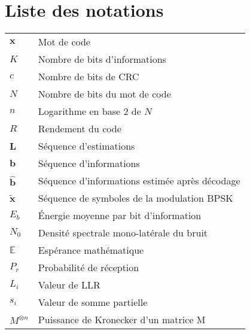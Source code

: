 \chapter*{Liste des notations}
\begin{center}

\begin{longtable}{ p{}  p{} } 

$\mathbold{x}$          & Mot de code                                             \\
$K$                     & Nombre de bits d'informations                           \\
$c$                     & Nombre de bits de CRC                                   \\
$N$                     & Nombre de bits du mot de code                           \\
$n$                     & Logarithme en base 2 de $N$                             \\
$R$                     & Rendement du code                                       \\
$\mathbold{L}$          & Séquence d'estimations                                  \\
$\mathbold{b}$          & Séquence d'informations                                 \\
$\mathbold{\hat{b}}$    & Séquence d'informations estimée après décodage          \\
$\mathbold{\tilde{x}}$  & Séquence de symboles de la modulation BPSK              \\
$E_b$                   & \'Energie moyenne par bit d'information                 \\
$N_0$                   & Densité spectrale mono-latérale du bruit                \\
$\mathbb{E}$            & Espérance mathématique                                  \\
$P_r$                   & Probabilité de réception                                \\
$L_i$                   & Valeur de LLR                                           \\
$s_i$                   & Valeur de somme partielle                               \\
$M^{\otimes n}$         & Puissance de Kronecker d'un matrice M                   \\

\end{longtable}
\end{center}
